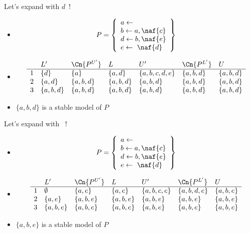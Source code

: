 \begin{frame}{Let's expand with $d$~!}
\begin{itemize}
\item<1-> []
\[
P
=
\left\{
  \begin{array}{l}
    a\leftarrow\\  b\leftarrow a,\naf{c}\\ d\leftarrow b,\naf{e}\\ e\leftarrow~\naf{d}
  \end{array}
\right\}
\]
\item<2-> []
\[
\begin{array}{cllllll}
  & L'        & \Cn{P^{U'}} & L         & U'            & \Cn{P^{L'}} & U        \\
\hline
1 & \{d\}     & \{a\}         & \{a,d\}   & \{a,b,c,d,e\} & \{a,b,d\}     & \{a,b,d\}\\
2 & \{a,d\}   & \{a,b,d\}     & \{a,b,d\} & \{a,b,d\}     & \{a,b,d\}     & \{a,b,d\}\\
3 & \{a,b,d\} & \{a,b,d\}     & \{a,b,d\} & \{a,b,d\}     & \{a,b,d\}     & \{a,b,d\}\\
\end{array}
\]
\medskip
\item<3->  $\{a,b,d\}$ is a stable model of $P$
\end{itemize}
\end{frame}
\begin{frame}{Let's expand with ~!}
\begin{itemize}
\item<1-> []
\[
P
=
\left\{
  \begin{array}{l}
    a\leftarrow\\  b\leftarrow a,\naf{c}\\ d\leftarrow b,\naf{e}\\ e\leftarrow~\naf{d}
  \end{array}
\right\}
\]
\item<2-> []
\[
\begin{array}{cllllll}
  & L'        & \Cn{P^{U'}} & L         & U'           & \Cn{P^{L'}} & U        \\
\hline
1 & \emptyset & \{a,e\}       & \{a,e\}   & \{a,b,c,e\}  & \{a,b,d,e\} & \{a,b,e\}\\
2 & \{a,e\}   & \{a,b,e\}     & \{a,b,e\} & \{a,b,e\}    & \{a,b,e\}   & \{a,b,e\}\\
3 & \{a,b,e\} & \{a,b,e\}     & \{a,b,e\} & \{a,b,e\}    & \{a,b,e\} & \{a,b,e\}\\
\end{array}
\]
\medskip
\medskip
\item<3->  $\{a,b,e\}$ is a stable model of $P$
\end{itemize}
\end{frame}
